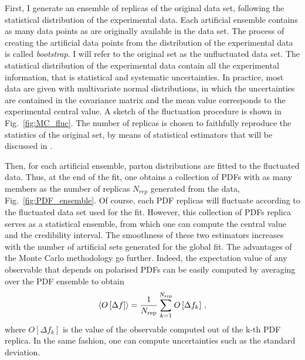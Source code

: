 First, I generate an ensemble of replicas of the original data set, following the statistical distribution of the experimental data. Each artificial ensemble contains as many data points as are originally available in the data set. The process of creating the artificial data points from the distribution of the experimental data is called \textit{bootstrap}. I will refer to the original set as the unfluctuated data set. The statistical distribution of the experimental data contain all the experimental information, that is statistical and systematic uncertainties. In practice, most data are given with multivariate normal distributions, in which the uncertainties are contained in the covariance matrix and the mean value corresponds to the experimental central value. A sketch of the fluctuation procedure is shown in Fig.~\ref{fig:MC_fluc}. The number of replicas is chosen to faithfully reproduce the statistics of the original set, by means of statistical estimators that will be discussed in .%

Then, for each artificial ensemble, parton distributions are fitted to the fluctuated data. Thus, at the end of the fit, one obtains a collection of PDFs with as many members as the number of replicas $N_{rep}$ generated from the data, Fig.~\ref{fig:PDF_ensemble}. Of course, each PDF replicas will fluctuate according to the fluctuated data set used for the fit. However, this collection of PDFs replica serves as a statistical ensemble, from which one can compute the central value and the credibility interval. The smoothness of these two estimators increases with the number of artificial sets generated for the global fit. The advantages of the Monte Carlo methodology go further. Indeed, the expectation value of any observable that depends on polarised PDFs can be easily computed by averaging over the PDF ensemble to obtain
\begin{equation}
  \left< O\left[ \Delta f \right] \right> = \frac{1}{N_{\textrm{rep}}} \sum_{k=1}^{N_{\textrm{rep}}} O\left[\Delta f_k\right] \,,
\end{equation}
where $O\left[\Delta f_k\right]$ is the value of the observable computed out of the k-th PDF replica. In the same fashion, one can compute uncertainties such as the standard deviation.
